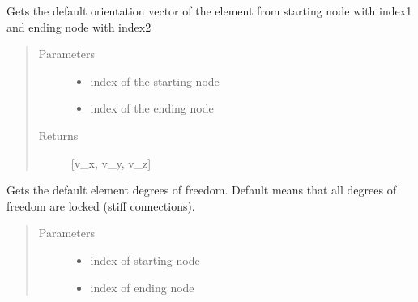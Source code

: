 \documentclass[letterpaper,10pt,english]{sphinxmanual}
\begin{document}
\begin{fulllineitems}
\begin{fulllineitems}
\label{\detokenize{api:beamon.database.Database.get_default_link_orientation}}
Gets the default orientation vector of the element from starting node with index1 and ending node with index2
\begin{quote}\begin{description}
\item[{Parameters}] \leavevmode\begin{itemize}
\item {} 
 \textendash{} index of the starting node

\item {} 
 \textendash{} index of the ending node

\end{itemize}

\item[{Returns}] \leavevmode
{[}v\_x, v\_y, v\_z{]}

\end{description}\end{quote}

\end{fulllineitems}


\begin{fulllineitems}
\label{\detokenize{api:beamon.database.Database.get_default_static_edof}}
Gets the default element degrees of freedom. Default means that all degrees of freedom are locked
(stiff connections).
\begin{quote}\begin{description}
\item[{Parameters}] \leavevmode\begin{itemize}
\item {} 
 \textendash{} index of starting node

\item {} 
 \textendash{} index of ending node


\end{itemize}
\end{description}
\end{quote}
\end{fulllineitems}
\end{fulllineitems}
\end{document}
